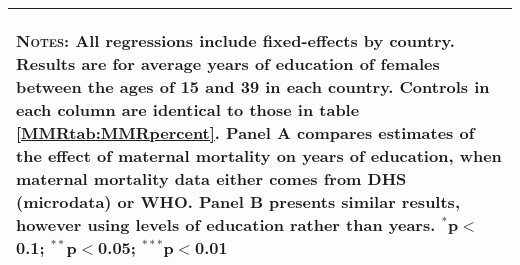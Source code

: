 \begin{landscape}
\begin{table}[htpb!]
\begin{center}
\begin{tabular}{lcccccccc}
\multicolumn{9}{p{20cm}}{\begin{footnotesize}\textsc{Notes:} All regressions include fixed-effects by country.  Results are for average years of education of females between the ages of 15 and 39 in each country.  Controls in each column are identical to those in table \ref{MMRtab:MMRpercent}. Panel A compares estimates of the effect of maternal mortality on years of education, when maternal mortality data either comes from DHS (microdata) or WHO.  Panel B presents similar results, however using levels of education rather than years.
$^{*}$p$<$0.1; $^{**}$p$<$0.05; $^{***}$p$<$0.01\end{footnotesize}} \\ \bottomrule 
\end{tabular}\end{center}\end{table}\end{landscape}